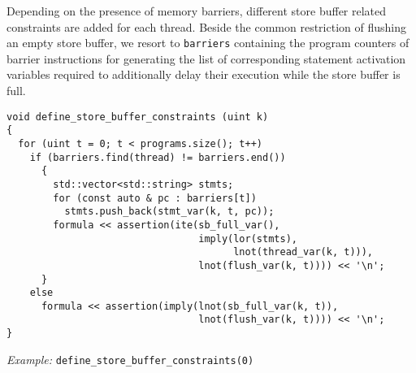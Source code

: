 %
Depending on the presence of memory barriers, different store buffer related constraints are added for each thread.
Beside the common restriction of flushing an empty store buffer, %
we resort to \texttt{barriers} containing the program counters of barrier instructions for generating the list of corresponding statement activation variables required to additionally delay their execution while the store buffer is full.

\newpage

\begin{lstlisting}[style=c++]
void define_store_buffer_constraints (uint k)
{
  for (uint t = 0; t < programs.size(); t++)
    if (barriers.find(thread) != barriers.end())
      {
        std::vector<std::string> stmts;
        for (const auto & pc : barriers[t])
          stmts.push_back(stmt_var(k, t, pc));
        formula << assertion(ite(sb_full_var(),
                                 imply(lor(stmts),
                                       lnot(thread_var(k, t))),
                                 lnot(flush_var(k, t)))) << '\n';
      }
    else
      formula << assertion(imply(lnot(sb_full_var(k, t)),
                                 lnot(flush_var(k, t)))) << '\n';
}
\end{lstlisting}

\noindent
\emph{Example:} \lstinline[style=c++]{define_store_buffer_constraints(0)}


